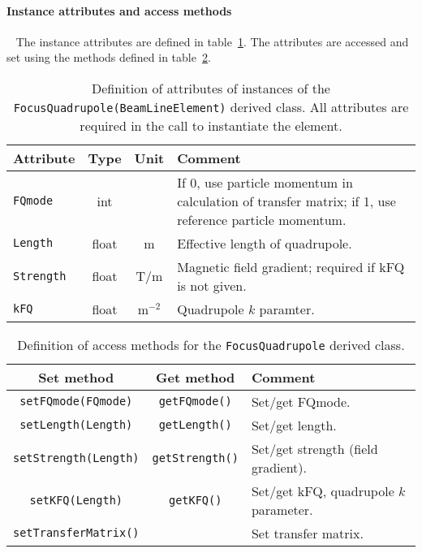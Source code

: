 \paragraph{Instance attributes and access methods} ~\newline
\label{SubSubSect:FQuad:InstAttr}
\noindent
The instance attributes are defined in
table~\ref{Tab:FQuad:Attributes}. 
The attributes are accessed and set using the methods defined in
table~\ref{Tab:FQuad:Methods}.
\begin{table}[h]
  \caption{
    Definition of attributes of instances of
    the \texttt{FocusQuadrupole(BeamLineElement)} derived class.
    All attributes are required in the call to instantiate the
    element.
  }
  \label{Tab:FQuad:Attributes}
  \begin{center}
    \begin{tabular}{|l|c|c|p{10cm}|}
      \hline
      \textbf{Attribute}   & \textbf{Type} & \textbf{Unit} & \textbf{Comment}                    \\
      \hline
      \texttt{FQmode}   & int   &       & If 0, use particle momentum in calculation of transfer
                                          matrix; if 1, use reference particle momentum.         \\
      \texttt{Length}   & float & m     & Effective length of quadrupole.                        \\
      \texttt{Strength} & float & T/m   & Magnetic field gradient; required if kFQ is not given. \\
      \texttt{kFQ}      & float & m$^{-2}$ & Quadrupole $k$ paramter.                               \\
      \hline
    \end{tabular}
  \end{center}
\end{table}
\begin{table}[h]
  \caption{
    Definition of access methods for the \texttt{FocusQuadrupole} derived
    class. 
  }
  \label{Tab:FQuad:Methods}
  \begin{center}
    \begin{tabular}{|c|c|p{7cm}|}
      \hline
      \textbf{Set method} & \textbf{Get method}  & \textbf{Comment}                                    \\
      \hline
      \texttt{setFQmode(FQmode)}   & \texttt{getFQmode()}   & Set/get FQmode.                        \\
      \texttt{setLength(Length)}   & \texttt{getLength()}   & Set/get length.                        \\
      \texttt{setStrength(Length)} & \texttt{getStrength()} & Set/get strength (field gradient).     \\
      \texttt{setKFQ(Length)}      & \texttt{getKFQ()}      & Set/get kFQ, quadrupole $k$ parameter. \\
      \texttt{setTransferMatrix()} &                        & Set transfer matrix.                   \\
      \hline
    \end{tabular}
  \end{center}
\end{table}

